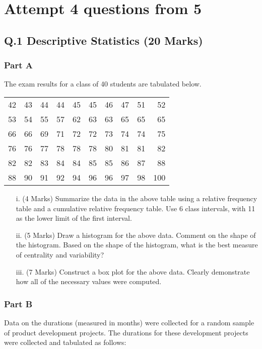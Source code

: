 \documentclass[a4paper,12pt]{article}
\begin{document}
\section*{Attempt 4 questions from 5}


\subsection*{Q.1 Descriptive Statistics (20 Marks)}
\subsubsection*{Part A} %
The exam results for a class of 40 students are tabulated below.
\begin{table}[ht]
\begin{center}
\begin{tabular}{|rrrrrrrrrr|}
\hline
42	&	43	&	44	&	44	&	45	&	45	&	46	&	47	&	51	&	52	\\
53	&	54	&	55	&	57	&	62	&	63	&	63	&	65	&	65	&	65	\\
66	&	66	&	69	&	71	&	72	&	72	&	73	&	74	&	74	&	75	\\
76	&	76	&	77	&	78	&	78	&	78	&	80	&	81	&	81	&	82	\\
82	&	82	&	83	&	84	&	84	&	85	&	85	&	86	&	87	&	88	\\
88	&	90	&	91	&	92	&	94	&	96	&	96	&	97	&	98	&	100	\\
\hline
\end{tabular}
\end{center}
\end{table}
\vspace{-0.5cm}
\begin{itemize}
\item[i.] (4 Marks) Summarize the data in the above table using a relative frequency table and a cumulative relative frequency table. Use 6 class intervals, with 11 as the lower limit of the first interval.
\item[ii.] (5 Marks) Draw a histogram for the above data. Comment on the shape of the histogram. Based on the shape of the histogram, what is the best measure of centrality and variability?
\item[iii.] (7 Marks) Construct a box plot for the above data. Clearly demonstrate how all of the necessary values were computed.
\end{itemize}

\vspace{0.25cm}
\subsubsection*{Part B} %
Data on the durations (measured in months) were collected for a random sample of product development projects.
The durations for these development projects were collected and tabulated as follows:
\end{document}
